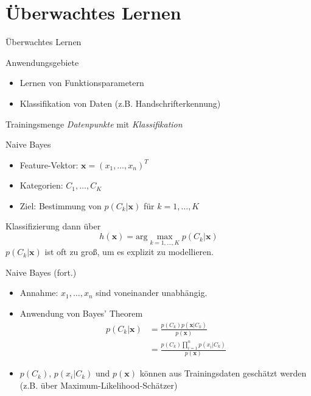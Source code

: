 \documentclass[xcolor={dvipsnames,svgnames}]{beamer}
\begin{document}
\section{Überwachtes Lernen}

\begin{frame}{Überwachtes Lernen}

  \begin{exampleblock}{Anwendungsgebiete}
    \begin{itemize}
    \item Lernen von Funktionsparametern
    \item Klassifikation von Daten (z.B. Handschrifterkennung)
    \end{itemize}
  \end{exampleblock}

  \begin{block}{Trainingsmenge}
    \textit{Datenpunkte} mit \textit{Klassifikation}
  \end{block}

\end{frame}

\begin{frame}{Naive Bayes}
  \begin{itemize}
  \item Feature-Vektor: $\mathbf{x} = (x_1,\ldots,x_n)^T$
  \item Kategorien: $C_1,\ldots,C_K$
  \item Ziel: Bestimmung von $p(C_k\vert \mathbf{x})$ für $k=1,\ldots,K$
  \end{itemize}
  Klassifizierung dann über
  \[
    h(\mathbf{x}) = \text{arg}\max_{k=1,\ldots,K} p(C_k\vert \mathbf{x})
  \]
  $p(C_k\vert \mathbf{x})$ ist oft zu groß, um es explizit zu modellieren.
\end{frame}

\begin{frame}{Naive Bayes (fort.)}
  \begin{itemize}
  \item Annahme: $x_1,\ldots,x_n$ sind voneinander unabhängig.
  \item Anwendung von Bayes' Theorem
    \begin{align*}
      p(C_k\vert \mathbf{x}) 
      &= \frac{p(C_k)p(\mathbf{x}|C_k)}{p(\mathbf{x})} \\
      &= \frac{p(C_k)\prod_{i=1}^n p(x_i|C_k)}{p(\mathbf{x})}
    \end{align*}
  \item $p(C_k)$, $p(x_i\vert C_k)$ und $p(\mathbf{x})$ können aus
    Trainingsdaten geschätzt werden (z.B. über Maximum-Likelihood-Schätzer)
  \end{itemize}
  
\end{frame}
\end{document}

